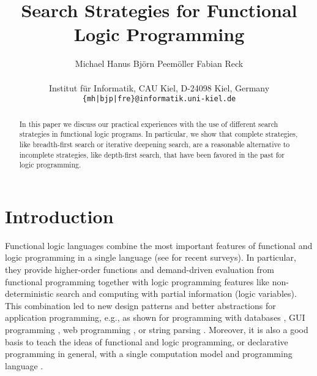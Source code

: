 \documentclass[english]{lni}
\author{
Michael Hanus
\quad
Bj{\"o}rn Peem{\"o}ller
\quad
Fabian Reck \\
\\
Institut f\"ur Informatik, CAU Kiel, D-24098 Kiel, Germany \\
\texttt{\{mh|bjp|fre\}@informatik.uni-kiel.de}
}
\title{Search Strategies for Functional Logic Programming}
\begin{document}
\maketitle

\begin{abstract}
In this paper we discuss our practical experiences
with the use of different search strategies
in functional logic programs.
In particular, we show that complete strategies,
like breadth-first search or iterative deepening search,
are a reasonable alternative to incomplete strategies, like depth-first
search, that have been favored in the past for logic programming.
\end{abstract}

\section{Introduction}

Functional logic languages combine the most important
features of functional and logic programming in a single language
(see \cite{AntoyHanus10CACM,Hanus07ICLP} for recent surveys).
In particular, they provide higher-order functions and demand-driven
evaluation from functional programming together with logic programming features
like non-deterministic search and computing with partial information
(logic variables).
This combination
led to new design patterns \cite{AntoyHanus02FLOPS,AntoyHanus11WFLP}
and better abstractions for application programming,
e.g., as shown for programming with databases
\cite{BrasselHanusMueller08PADL,Fischer05},
GUI programming \cite{Hanus00PADL},
web programming \cite{Hanus01PADL,Hanus06PPDP,HanusKoschnicke10PADL},
or string parsing \cite{CaballeroLopez99}.
Moreover, it is also a good basis
to teach the ideas of functional and logic programming,
or declarative programming in general,
with a single computation model and programming language
\cite{Hanus97DPLE}.
\end{document}
